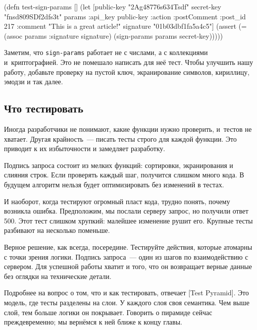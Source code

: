 \else

\begin{english}
  \begin{clojure}
(defn test-sign-params []
  (let [public-key "2Ag48776s634Tsdf"
        secret-key "fnsd809SDf2dfs3t"
        params {:api_key public-key
                :action :postComment
                :post_id 217
                :comment "This is a great article!"}
        signature "01b03dbf1fa5a4c5"]
    (assert (= (assoc params :signature signature)
               (sign-params params secret-key)))))
  \end{clojure}
\end{english}

\fi

Заметим, что \verb|sign-params| работает не с числами, а с коллекциями
и~криптографией. Это не помешало написать для неё тест. Чтобы улучшить нашу
работу, добавьте проверку на пустой ключ, экранирование символов, кириллицу,
эмодзи и так далее.

\subsection{Что тестировать}

Иногда разработчики не понимают, какие функции нужно проверить, и~тестов не
хватает. Другая крайность~--- писать тесты строго для каждой функции. Это
приводит к их избыточности и замедляет разработку.

Подпись запроса состоит из мелких функций: сортировки, экранирования и слияния
строк. Если проверять каждый шаг, получится слишком много кода. В будущем
алгоритм нельзя будет оптимизировать без изменений в тестах.

И наоборот, когда тестируют огромный пласт кода, трудно понять, почему возникла
ошибка. Предположим, мы послали серверу запрос, но получили ответ 500. Этот тест
слишком хрупкий: малейшее изменение рушит его. Крупные тесты разбивают на
несколько поменьше.

Верное решение, как всегда, посередине. Тестируйте действия, которые атомарны с
точки зрения логики. Подпись запроса~--- один из шагов по взаимодействию с
сервером. Для успешной работы хватит и того, что он возвращает верные данные без
оглядки на технические детали.


Подробнее на вопрос о том, что и как тестировать, отвечает
[Test Pyramid].
Это модель, где тесты разделены на слои. У каждого слоя своя семантика. Чем выше
слой, тем больше логики он покрывает. Говорить о пирамиде сейчас преждевременно; мы
вернёмся к ней ближе к концу главы.

